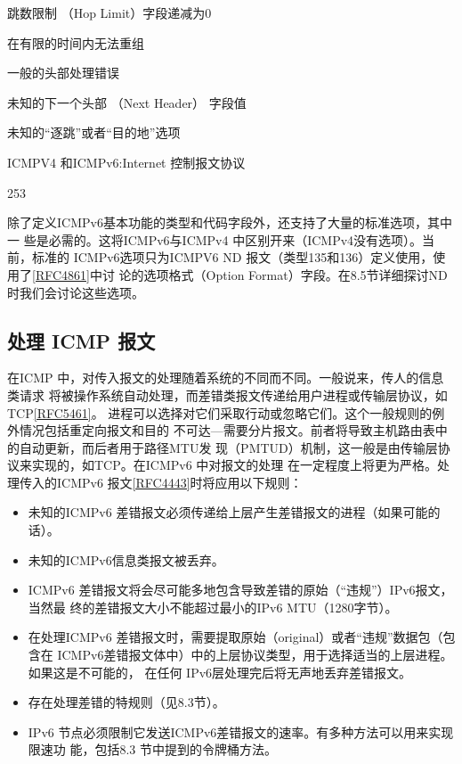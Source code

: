 跳数限制 （Hop Limit）字段递减为0

在有限的时间内无法重组

一般的头部处理错误

未知的下一个头部 （Next Header） 字段值

未知的“逐跳”或者“目的地”选项

ICMPV4 和ICMPv6:Internet 控制报文协议

253

除了定义ICMPv6基本功能的类型和代码字段外，还支持了大量的标准选项，其中一
些是必需的。这将ICMPv6与ICMPv4 中区别开来（ICMPv4没有选项）。当前，标准的
ICMPv6选项只为ICMPV6 ND 报文（类型135和136）定义使用，使用了\href{https://www.rfc-editor.org/rfc/rfc4861}{[RFC4861]}中讨
论的选项格式（Option Format）字段。在8.5节详细探讨ND 时我们会讨论这些选项。

\subsection{处理 ICMP 报文}
在ICMP 中，对传入报文的处理随着系统的不同而不同。一般说来，传人的信息类请求
将被操作系统自动处理，而差错类报文传递给用户进程或传输层协议，如 TCP\href{https://www.rfc-editor.org/rfc/rfc5461}{[RFC5461]}。
进程可以选择对它们采取行动或忽略它们。这个一般规则的例外情况包括重定向报文和目的
不可达—需要分片报文。前者将导致主机路由表中的自动更新，而后者用于路径MTU发
现（PMTUD）机制，这一般是由传输层协议来实现的，如TCP。在ICMPv6 中对报文的处理
在一定程度上将更为严格。处理传入的ICMPv6 报文\href{https://www.rfc-editor.org/rfc/rfc4443}{[RFC4443]}时将应用以下规则：

\begin{itemize}
	\item 未知的ICMPv6 差错报文必须传递给上层产生差错报文的进程（如果可能的话）。
	\item 未知的ICMPv6信息类报文被丢弃。
	\item ICMPv6 差错报文将会尽可能多地包含导致差错的原始（“违规”）IPv6报文，当然最
	      终的差错报文大小不能超过最小的IPv6 MTU（1280字节）。
	\item 在处理ICMPv6 差错报文时，需要提取原始（original）或者“违规”数据包（包含在
	      ICMPv6差错报文体中）中的上层协议类型，用于选择适当的上层进程。如果这是不可能的，
	      在任何 IPv6层处理完后将无声地丢弃差错报文。
	\item 存在处理差错的特规则（见8.3节）。
	\item IPv6 节点必须限制它发送ICMPv6差错报文的速率。有多种方法可以用来实现限速功
	      能，包括8.3 节中提到的令牌桶方法。
\end{itemize}

